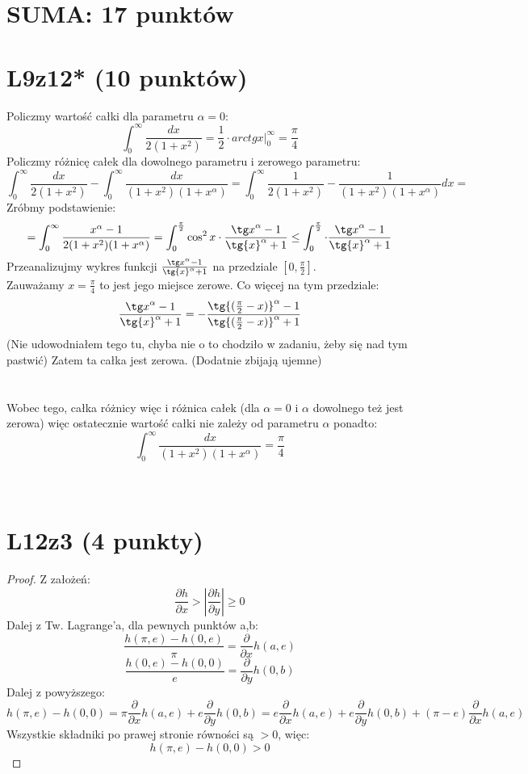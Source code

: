 \documentclass{article}
\title{}
\date{28.05.2020}
\author{Maurycy Borkowski}
\begin{document}
\maketitle

\section{SUMA: 17 punktów}
\section{L9z12* (10 punktów)}
Policzmy wartość całki dla parametru $\alpha = 0$:
$$
\int_0^\infty \frac{dx}{2(1+x^2)} = \frac{1}{2} \cdot arctg{x} |_0^\infty = \frac{\pi}{4}
$$
Policzmy różnicę całek dla dowolnego parametru i zerowego parametru:
$$
\int_0^\infty \frac{dx}{2(1+x^2)} - \int_0^\infty \frac{dx}{(1+x^2)(1+x^\alpha)} = \int_0^\infty \frac{1}{2(1+x^2)} - \frac{1}{(1+x^2)(1+x^\alpha)} dx =
$$
Zróbmy podstawienie:
$$
=\int_0^\infty \frac{x^\alpha - 1}{2(1+x^2)(1+x^\alpha)} = \int_0^{\frac{\pi}{2}} \cos^2{x} \cdot \frac{{\tg x}^\alpha - 1}{{\tg{x}}^\alpha + 1} \leq \int_0^{\frac{\pi}{2}} \cdot \frac{{\tg x}^\alpha - 1}{{\tg{x}}^\alpha + 1}
$$
Przeanalizujmy wykres funkcji $\frac{{\tg x}^\alpha - 1}{{\tg{x}}^\alpha + 1}$ na przedziale $[0,\frac{\pi}{2}]$.\\
Zauważamy $x = \frac{\pi}{4}$ to jest jego miejsce zerowe. Co więcej na tym przedziale:
$$
\frac{{\tg x}^\alpha - 1}{{\tg{x}}^\alpha + 1} = - \frac{\tg{(\frac{\pi}{2} - x)}^\alpha - 1}{{\tg{(\frac{\pi}{2} - x)}^\alpha + 1}}
$$
(Nie udowodniałem tego tu, chyba nie o to chodziło w zadaniu, żeby się nad tym pastwić) Zatem ta całka jest zerowa. (Dodatnie zbijają ujemne)\\\\\\
Wobec tego, całka różnicy więc i różnica całek (dla $\alpha = 0$ i $\alpha$ dowolnego też jest zerowa) więc ostatecznie wartość całki nie zależy od parametru $\alpha$ ponadto:
$$
\int_0^\infty \frac{dx}{(1+x^2)(1+x^\alpha)} = \frac{\pi}{4}
$$\\\\
\section{L12z3 (4 punkty)}
\begin{proof}
Z założeń:
$$
\frac{\partial h}{\partial x} > \left| \frac{\partial h}{\partial y} \right| \geq 0
$$
Dalej z Tw. Lagrange'a, dla pewnych punktów a,b:
$$
\frac{h(\pi,e) - h(0,e)}{\pi} = \frac{\partial}{\partial x} h(a,e)
$$
$$
\frac{h(0,e) - h(0,0)}{e} = \frac{\partial}{\partial y} h(0,b)
$$
Dalej z powyższego:
$$
h(\pi,e) - h(0,0) = \pi \frac{\partial}{\partial x} h(a,e) + e \frac{\partial}{\partial y} h(0,b) = e \frac{\partial}{\partial x} h(a,e) + e \frac{\partial}{\partial y} h(0,b) + (\pi - e)\frac{\partial}{\partial x} h(a,e)
$$
Wszystkie składniki po prawej stronie równości są $> 0$, więc:
$$
h(\pi,e) - h(0,0) > 0
$$
\end{proof}
\end{document}
